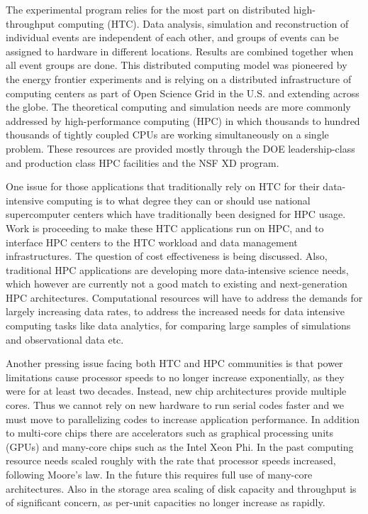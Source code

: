 The experimental program relies for the most part on distributed high-throughput computing (HTC).  Data analysis, simulation and reconstruction of individual events are independent of each other, and groups of events can be assigned to hardware in different locations. Results are combined together when all event groups are done.  This distributed computing model was pioneered by the energy frontier experiments and is relying on a distributed infrastructure of computing centers as part of Open Science Grid in the U.S. and extending across the globe. The theoretical computing and simulation needs are more commonly addressed by high-performance computing (HPC) in which thousands to hundred thousands of tightly coupled CPUs are working simultaneously on a single problem. These resources are provided mostly through the DOE leadership-class and production class HPC facilities and the NSF XD program. 

One issue for those applications that traditionally rely on HTC for their data-intensive computing is to what degree they can or should use national supercomputer centers which have traditionally been designed for HPC usage. Work is proceeding to make these HTC applications run on HPC, and to interface HPC centers to the HTC workload and data management infrastructures. The question of cost effectiveness is being discussed.  Also, traditional HPC applications are developing more data-intensive science needs, which however are currently not a good match to existing and next-generation HPC architectures.  Computational resources will have to address the demands for largely increasing data rates, to address the increased needs for data intensive computing tasks like data analytics, for comparing large samples of simulations and observational data etc. 

Another pressing issue facing both HTC and HPC communities is that power limitations cause processor speeds to no longer increase exponentially, as they were for at least two decades.  Instead, new chip architectures provide multiple cores. Thus we cannot rely on new hardware to run serial codes faster and we must move to parallelizing codes to increase application performance. In addition to multi-core chips there are accelerators such as graphical processing units (GPUs) and many-core chips such as the Intel Xeon Phi. In the past computing resource needs scaled roughly with the rate that processor speeds increased, following Moore’s law. In the future this requires full use of many-core architectures. Also in the storage area scaling of disk capacity and throughput is of significant concern, as per-unit capacities no longer increase as rapidly. 

